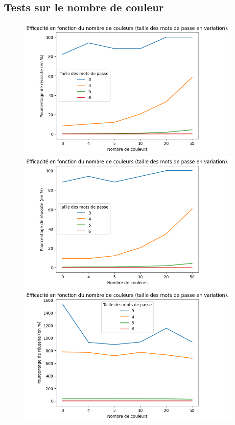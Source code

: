 \documentclass[french,12pt]{article}
\begin{document}
    \newpage
    \subsection{Tests sur le nombre de couleur}
   
         \begin{figure}[hbt!]
                \centering
   
      \includegraphics[scale=0.65]{img/graphe/md5/C_S_T_100000_MotGenerator.png}
  
    
      \includegraphics[scale=0.65]{img/graphe/sha3/C_S_T_100000_MotGenerator.png}

      \includegraphics[scale=0.65]{img/graphe/pearson/C_S_T_100000_MotGenerator.png}
    

\end{figure}
\end{document}
